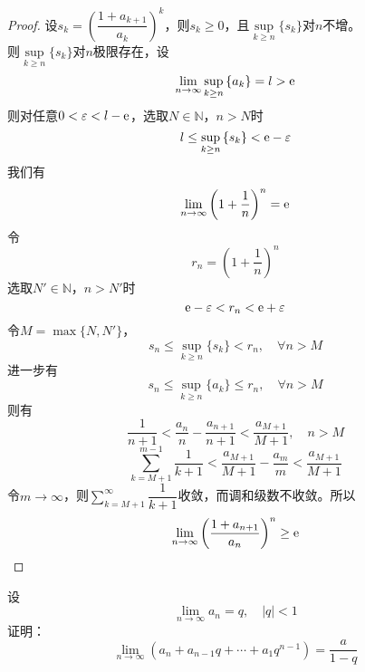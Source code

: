 \begin{proof}

    设$s_k = \left( \dfrac{1 + a_{k + 1}}{a_k} \right)^k$，则$s_k \geq 0$，且$\sup\limits_{k \geq n}\{s_k\}$对$n$不增。\\
    则$\sup\limits_{k\geq n}\{s_k\}$对$n$极限存在，设
    $$\lim\limits_{n \to \infty}{\sup_{k\geq n}{\{a_k\}}} = l >\mathrm{e}$$
    则对任意$0 < \varepsilon < l - \mathrm{e}$，选取$N \in \mathbb{N}$，$n > N$时
    $$l \leq \sup_{k\geq n }{\{s_k\}} < \mathrm{e} - \varepsilon$$
    我们有
    $$\lim\limits_{n \to \infty}{\left( 1 + \dfrac{1}{n}\right)^n} = \mathrm{e}$$
    令
    $$r_n = \left(1 + \dfrac{1}{n}\right)^n$$
    选取$N' \in \mathbb{N}$，$n > N'$时
    $$\mathrm{e} - \varepsilon < r_n < \mathrm{e} + \varepsilon$$
    令$M = \max\{N,N'\}$，
    $$s_n \leq \sup_{k\geq n}\{s_k\} < r_n, \quad \forall n > M$$
    进一步有
    $$s_n \leq \sup_{k\geq n}\{a_k\} \leq r_n,\quad \forall n > M$$
    则有
    $$\dfrac{1}{n + 1} < \dfrac{a_n}{n} - \dfrac{a_{n + 1}}{n + 1} < \dfrac{a_{M + 1}}{M + 1}, \quad n > M$$
    $$\sum\limits_{k = M + 1}^{m - 1}{\dfrac{1}{k + 1}} < \dfrac{a_{M + 1}}{M + 1} - \dfrac{a_m}{m} < \dfrac{a_{M + 1}}{M + 1}$$
    令$m \to \infty$，则$\sum\limits_{k = M + 1}^{\infty}{\dfrac{1}{k + 1}}$收敛，而调和级数不收敛。所以
    $$\lim\limits_{n \to \infty}{\left( \dfrac{1 + a_{n + 1}}{a_n} \right)^n} \geq \mathrm{e}$$

\end{proof}

\begin{proposition}
    
    设
    $$\lim\limits_{n \to \infty}{a_n} = q, \quad |q| < 1$$
    证明：
    $$\lim\limits_{n \to \infty}{(a_n + a_{n - 1}q + \cdots + a_1q^{n - 1})} = \dfrac{a}{1 - q}$$

\end{proposition}

